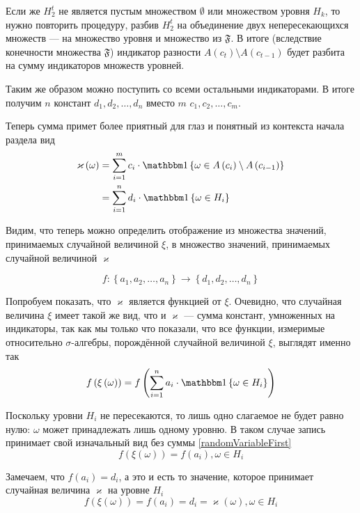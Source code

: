 Если же $H_2^t$ не является пустым множеством $\emptyset$
или множеством уровня $H_k$, то нужно повторить процедуру,
разбив $H_2^t$ на объединение двух непересекающихся множеств --- на множество
уровня и множество из $\mathfrak{F}$.
В итоге (вследствие конечности множества $\mathfrak{F}$)
индикатор разности $A\left( c_{t} \right) \setminus A\left( c_{t-1} \right)$
будет разбита на сумму индикаторов множеств уровней.

Таким же образом можно поступить со всеми остальными индикаторами.
В итоге получим $n$ констант $d_1, d_2, \dots, d_n$
вместо $m$ $c_1, c_2, \dots, c_m$.

Теперь сумма примет более приятный для глаз
и понятный из контекста начала раздела вид
\begin{align*}
    \varkappa\left( \omega \right)
        &= \sum_{i=1}^m c_i \cdot \Indicator{\omega
            \in A\left( c_{i} \right) \setminus A\left( c_{i-1} \right)} \\
        &= \sum_{i=1}^n d_i \cdot \Indicator{\omega \in H_i}
\end{align*}

Видим, что теперь можно определить отображение из множества значений,
принимаемых случайной величиной $\xi$, в множество значений,
принимаемых случайной величиной $\varkappa$

$$f: \left\{ a_1, a_2, \dots, a_n \right\}
    \rightarrow \left\{ d_1, d_2, \dots, d_n \right\}$$

Попробуем показать, что $\varkappa$ является функцией от $\xi$.
Очевидно, что случайная величина $\xi$ имеет такой же вид,
что и $\varkappa$ --- сумма констант, умноженных на индикаторы,
так как мы только что показали, что все функции,
измеримые относительно $\sigma$-алгебры, порождённой случайной величиной $\xi$,
выглядят именно так
$$f\left( \xi\left( \omega \right) \right)
    = f\left( \sum_{i=1}^n a_i \cdot \Indicator{\omega \in H_i} \right)$$

Поскольку уровни $H_i$ не пересекаются,
то лишь одно слагаемое не будет равно нулю:
$\omega$ может принадлежать лишь одному уровню.
В таком случае запись принимает свой изначальный вид без суммы
\eqref{randomVariableFirst}
$$f\left( \xi\left( \omega \right) \right)
    = f\left( a_i \right), \omega \in H_i$$

Замечаем, что $f\left( a_i \right) = d_i$, а это и есть то значение,
которое принимает случайная величина $\varkappa$ на уровне $H_i$
$$f\left( \xi\left( \omega \right) \right)
    = f\left( a_i \right) = d_i
    = \varkappa\left( \omega \right), \omega \in H_i$$

